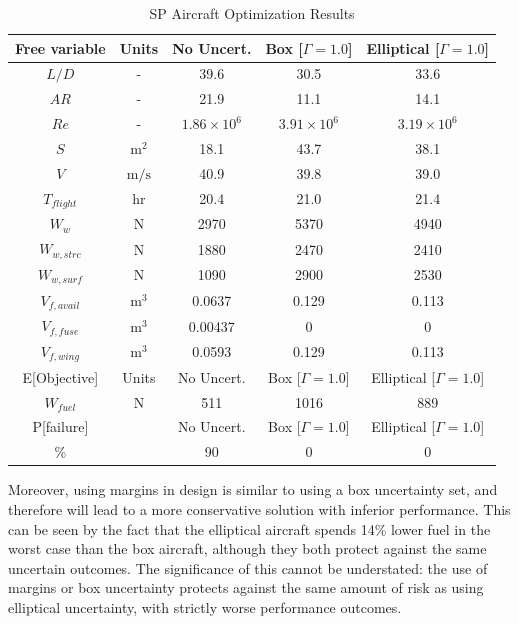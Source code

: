 \begin{table}[!h]
\begin{center}
\caption{\label{tab:results} SP Aircraft Optimization Results}
\begin{tabular}{c c c c c}
\hline
Free variable & Units & No Uncert. & Box [$\Gamma = 1.0$] & Elliptical [$\Gamma = 1.0$] \\
\hline
$L/D$ & - & 39.6 & 30.5 & 33.6 \\
$AR$ & - & 21.9 & 11.1 & 14.1 \\
$Re$ & - & $1.86 \times 10^6$ & $3.91\times 10^6$ & $3.19 \times 10^6$ \\
$S$ & $\mathrm{m^2}$ & 18.1 & 43.7 & 38.1 \\
$V$ & $\mathrm{m/s}$ & 40.9 & 39.8 & 39.0 \\
$T_{flight}$ & $\mathrm{hr}$ & 20.4 & 21.0 & 21.4 \\
$W_w$ & $\mathrm{N}$ & 2970 & 5370 & 4940 \\
$W_{w,strc}$ & $\mathrm{N}$ & 1880 & 2470 & 2410 \\
$W_{w,surf}$ & $\mathrm{N}$ & 1090 & 2900 & 2530 \\
$V_{f,avail}$ & $\mathrm{m^3}$ & 0.0637 & 0.129 & 0.113 \\
$V_{f,fuse}$ & $\mathrm{m^3}$ & 0.00437 & 0 & 0 \\
$V_{f,wing}$ & $\mathrm{m^3}$ & 0.0593 & 0.129 & 0.113 \\
\hline
E[Objective] & Units & No Uncert. & Box [$\Gamma = 1.0$] & Elliptical [$\Gamma = 1.0$] \\
\hline
$W_{fuel}$ & $\mathrm{N}$ & 511 & 1016 & 889 \\
\hline
P[failure] & & No Uncert. & Box [$\Gamma = 1.0$] & Elliptical [$\Gamma = 1.0$] \\
\hline
\% & & 90 & 0 & 0\\
\hline
\end{tabular}
\end{center}
\end{table}

Moreover, using margins in design is similar to using a box uncertainty set, and therefore will lead
to a more conservative solution with inferior performance. This can be seen by the fact that
the elliptical aircraft spends 14\% lower fuel in the worst case
than the box aircraft, although they both protect against the same uncertain outcomes.
The significance of this cannot be understated: the use of margins or box uncertainty protects
against the same amount of risk as using elliptical uncertainty, with strictly worse performance outcomes.

